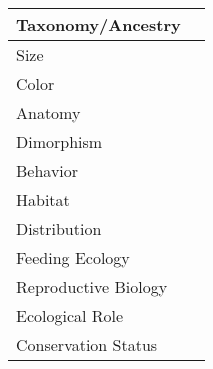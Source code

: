 \subsection{}
\begin{center}
\begin{longtabu} to 

	\hline
	Taxonomy/Ancestry &
	
	 \\
	\hline
	Size & 
	
	\\
	\hline
	Color &
	
	 \\
	\hline
	Anatomy &
	
	 \\
	\hline
	Dimorphism & 
	
	\\
	\hline
	Behavior & 
	
	\\
	\hline
	Habitat & 
	
	\\
	\hline
	Distribution & 
	
	\\
	\hline
	Feeding Ecology & 
	
	\\
	\hline
	Reproductive Biology & 
	
	\\
	\hline
	Ecological Role &
	
	\\
	\hline
	Conservation Status & 
	
	\\
	\hline
\end{longtabu}
\end{center}